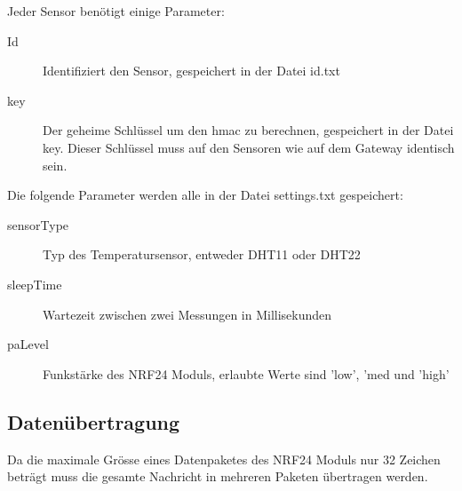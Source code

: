 \documentclass[
  12pt, %
  a4paper, %
  twoside, %
  openany, %
  numbers=noenddot, %
  BCOR=5mm, %
  parskip=half*, %
  thesis, %
]{bfhbook}
\begin{document}
 Jeder Sensor benötigt einige Parameter:
 \begin{description}
\item[Id] Identifiziert den Sensor, gespeichert in der Datei id.txt
\item[key] Der geheime Schlüssel um den \Gls{hmac} zu berechnen, gespeichert in der Datei key. Dieser Schlüssel muss auf den Sensoren wie auf dem Gateway identisch sein.
\end{description}
Die folgende Parameter werden alle in der Datei settings.txt gespeichert:
 \begin{description}
\item[sensorType] Typ des Temperatursensor, entweder DHT11 oder DHT22
\item[sleepTime] Wartezeit zwischen zwei Messungen in Millisekunden
\item[paLevel] Funkstärke des NRF24 Moduls, erlaubte Werte sind 'low', 'med und 'high'
\end{description}

\subsection{Datenübertragung}
Da die maximale Grösse eines Datenpaketes des NRF24 Moduls nur 32 Zeichen beträgt muss die gesamte Nachricht in mehreren Paketen übertragen werden.
\end{document}
